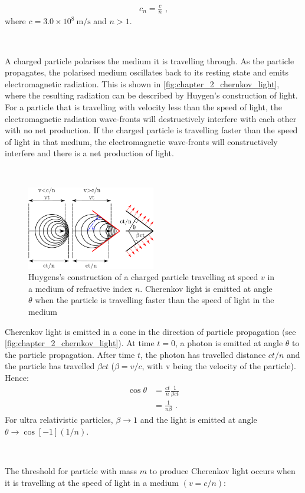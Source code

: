 \begin{equation}
    \begin{aligned}
    c_n = \frac{c}{n}\text{ ,}
    \end{aligned}
\end{equation}
\noindent where $c=3.0\times 10^8~\si{\meter\per\second}$ and $n>1$.
\par~\par 
A charged particle polarises the medium it is travelling through. As the particle propagates, the polarised medium oscillates back to its resting state and emits electromagnetic radiation. This is shown in \autoref{fig:chapter_2_chernkov_light}, where the resulting radiation can be described by Huygen's construction of light. For a particle that is travelling with velocity less than the speed of light, the electromagnetic radiation wave-fronts will destructively interfere with each other with no net production. If the charged particle is travelling faster than the speed of light in that medium, the electromagnetic wave-fronts will constructively interfere and there is a net production of light.
\par~\par
\begin{figure}
    \includegraphics[width=0.5\textwidth]{05_Astronomy/Images/air_shower/chernkov_light.png}
    \caption{Huygens's construction of a charged particle travelling at speed $v$ in a medium of refractive index $n$. Cherenkov light is emitted at angle $\theta$ when the particle is travelling faster than the speed of light in the medium}
    \label{fig:chapter_2_chernkov_light}
\end{figure}
Cherenkov light is emitted in a cone in the direction of particle propagation (see \autoref{fig:chapter_2_chernkov_light}). At time $t=0$, a photon is emitted at angle $\theta$ to the particle propagation. After time $t$, the photon has travelled distance $ct/n$ and the particle has travelled $\beta ct$ ($\beta=v/c$, with v being the velocity of the particle). Hence:
\begin{equation}
    \begin{aligned}
    \cos\theta &= \frac{ct}{n} \frac{1}{\beta ct} \\
    &=\frac{1}{n\beta}\text{ .}
    \end{aligned}
\end{equation}
\noindent For ultra relativistic particles, $\beta\rightarrow 1$ and the light is emitted at angle $\theta \rightarrow \cos[-1](1/n)$.
\par~\par
The threshold for particle with mass $m$ to produce Cherenkov light occurs when it is travelling at the speed of light in a medium $(v=c/n)$:

